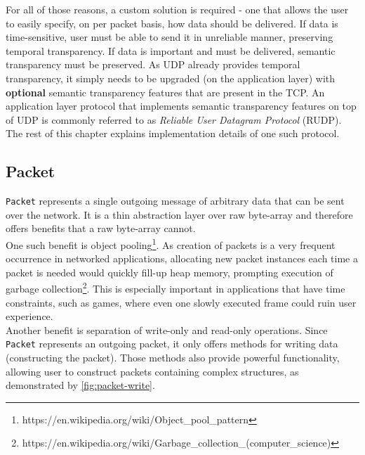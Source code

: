 \documentclass[times, utf8, diplomski]{fer}
\newcommand{\classname}[1]{\texttt{#1}}
\begin{document}
For all of those reasons, a custom solution is required - one that allows the user to easily specify, on per packet basis, how data should be delivered. If data is time-sensitive, user must be able to send it in unreliable manner, preserving temporal transparency. If data is important and must be delivered, semantic transparency must be preserved. As UDP already provides temporal transparency, it simply needs to be upgraded (on the application layer) with \textbf{optional} semantic transparency features that are present in the TCP. An application layer protocol that implements semantic transparency features on top of UDP is commonly referred to as \textit{Reliable User Datagram Protocol} (RUDP). The rest of this chapter explains implementation details of one such protocol.



\subsection{Packet}
\classname{Packet} represents a single outgoing message of arbitrary data that can be sent over the network. It is a thin abstraction layer over raw byte-array and therefore offers benefits that a raw byte-array cannot. \\

One such benefit is object pooling\footnote{https://en.wikipedia.org/wiki/Object\_pool\_pattern}. As creation of packets is a very frequent occurrence in networked applications, allocating new packet instances each time a packet is needed would quickly fill-up heap memory, prompting execution of garbage collection\footnote{https://en.wikipedia.org/wiki/Garbage\_collection\_(computer\_science)}. This is especially important in applications that have time constraints, such as games, where even one slowly executed frame could ruin user experience. \\

Another benefit is separation of write-only and read-only operations. Since \classname{Packet} represents an outgoing packet, it only offers methods for writing data (constructing the packet). Those methods also provide powerful functionality, allowing user to construct packets containing complex structures, as demonstrated by \ref{fig:packet-write}. \\
\end{document}
